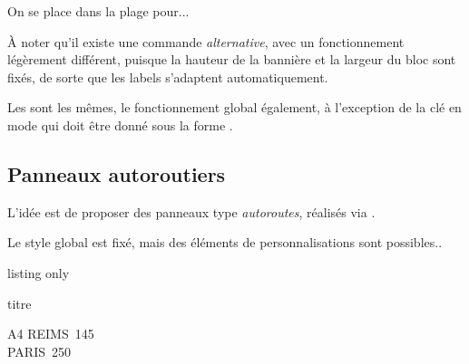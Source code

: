 \documentclass[french,11pt,a4paper]{article}
\begin{document}
\begin{DemoCode}{}
\NewDocumentCommand{}
On se place dans la plage  pour...
\end{DemoCode}

\pagebreak

À noter qu'il existe une commande \textit{alternative}, avec un fonctionnement légèrement différent, puisque la hauteur de la bannière et la largeur du bloc sont fixés, de sorte que les labels s'adaptent automatiquement.

Les  sont les mêmes, le fonctionnement global également, à l'exception de la clé \MontreCode{[customtype]} en mode  qui doit être donné sous la forme \MontreCode{[customtype=L1+L2]}.

\begin{DemoCode}{}

\end{DemoCode}

\pagebreak

\subsection{Panneaux autoroutiers}

L'idée est de proposer des panneaux type \textit{autoroutes}, réalisés via .

Le style global est fixé, mais des éléments de personnalisations sont possibles..

\begin{DemoCode}{listing only}
\begin{PanneauAutoroute}[clés]{titre}
\end{PanneauAutoroute}
\end{DemoCode}

\begin{DemoCode}{}
\begin{PanneauAutoroute}{A4}
REIMS\hfill~145\\
PARIS\hfill~250
\end{PanneauAutoroute}
\end{DemoCode}
\end{document}

